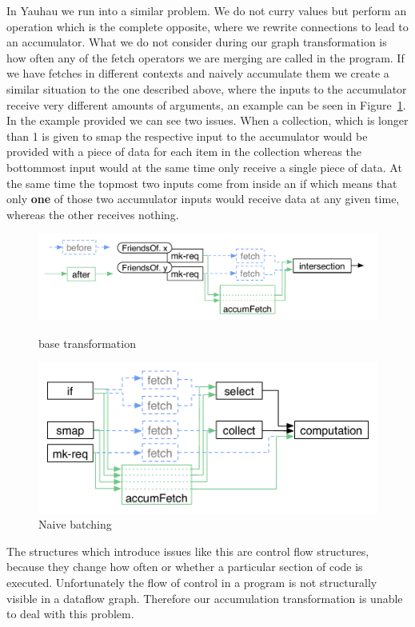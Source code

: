 In Yauhau we run into a similar problem.
We do not curry values but perform an operation which is the complete opposite, where we rewrite connections to lead to an accumulator.
What we do not consider during our graph transformation is how often any of the fetch operators we are merging are called in the program.
If we have fetches in different contexts and naively accumulate them we create a similar situation to the one described above, where the inputs to the accumulator receive very different amounts of arguments, an example can be seen in Figure~\ref{fig:naive-batching-context-problem}.
In the example provided we can see two issues.
When a collection, which is longer than 1 is given to smap the respective input to the accumulator would be provided with a piece of data for each item in the collection whereas the bottommost input would at the same time only receive a single piece of data.
At the same time the topmost two inputs come from inside an if which means that only \textbf{one} of those two accumulator inputs would receive data at any given time, whereas the other receives nothing.

\begin{figure}
    \includegraphics[width=\textwidth]{Figures/yauhau-transformation}
	\caption{base transformation}
	\label{figure:yauhau-transformation}
    \includegraphics[width=\textwidth]{../Figures/naive-transformation}
	\caption{Naive batching}
	\label{fig:naive-batching-context-problem}
\end{figure}

The structures which introduce issues like this are control flow structures, because they change how often or whether a particular section of code is executed.
Unfortunately the flow of control in a program is not structurally visible in a dataflow graph.
Therefore our accumulation transformation is unable to deal with this problem.

